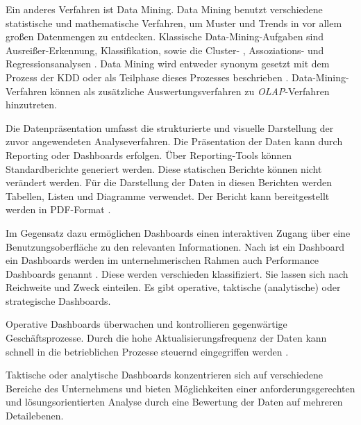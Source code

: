Ein anderes Verfahren ist Data Mining. Data Mining benutzt verschiedene statistische und mathematische Verfahren, um Muster und Trends in vor allem
großen Datenmengen zu entdecken. Klassische Data-Mining-Aufgaben sind Ausreißer-Erkennung, Klassifikation, sowie die Cluster- , Assoziations- und Regressionsanalysen \cite[vgl.][15 ff.]{han_data_2012}.
Data Mining wird entweder synonym gesetzt mit dem Prozess der \acrfull{KDD} oder als Teilphase dieses Prozesses beschrieben
\cites[vgl.][6]{han_data_2012}[vgl.][142 f.]{linden_geschaftsmodellbasierte_2016}.
Data-Mining-Verfahren können als zusätzliche Auswertungsverfahren zu \textit{\acrshort{OLAP}}-Verfahren hinzutreten.

Die Datenpräsentation umfasst die strukturierte und visuelle Darstellung der zuvor angewendeten Analyseverfahren.
Die Präsentation der Daten kann durch Reporting oder Dashboards erfolgen. Über Reporting-Tools können Standardberichte generiert werden. 
Diese statischen Berichte können nicht verändert werden. Für die Darstellung der Daten in diesen Berichten werden
Tabellen, Listen und Diagramme verwendet. Der Bericht kann bereitgestellt werden in PDF-Format \cite[vgl.][114]{bange_werkzeuge_2016}.


Im Gegensatz dazu ermöglichen Dashboards einen interaktiven Zugang über eine Benutzungsoberfläche zu den relevanten Informationen.
Nach  ist ein Dashboard ein  \cite[26]{few_information_2006} Dashboards werden im unternehmerischen Rahmen auch Performance Dashboards genannt \cite[vgl.][154]{linden_geschaftsmodellbasierte_2016}.
Diese werden verschieden klassifiziert. Sie lassen sich nach Reichweite und Zweck einteilen. Es gibt operative, taktische (analytische) oder strategische Dashboards. 


Operative Dashboards überwachen und kontrollieren gegenwärtige Geschäftsprozesse. Durch die hohe Aktualisierungsfrequenz der Daten kann schnell in 
die betrieblichen Prozesse steuernd eingegriffen werden \cites[vgl.][11 f.]{eckerson_performance_2011}[vgl.][30 f.]{few_information_2006}.


Taktische oder analytische Dashboards konzentrieren sich auf verschiedene Bereiche des Unternehmens 
und bieten Möglichkeiten einer anforderungsgerechten und lösungsorientierten Analyse durch eine Bewertung der Daten auf mehreren Detailebenen. 


